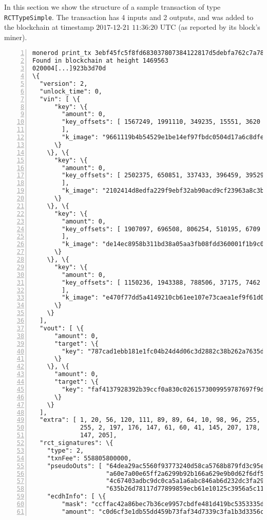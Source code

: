 \begin{appendices}
In this section we show the structure of a sample transaction of type {\tt RCTTypeSimple}. The transaction has 4 inputs and 2 outputs, and was added to the blockchain at timestamp \( \textrm{2017-12-21 11:36:20 UTC} \) (as reported by its block's miner).


\begin{Verbatim}[commandchars=\\\{\}, numbers=left]
monerod print_tx 3ebf45fc5f8fd683037807384122817d5debfa762c7a7845cb7ccfe9ee20940b 
Found in blockchain at height 1469563
020004[...]923b3d70d
\{
  "version": 2, 
  "unlock_time": 0, 
  "vin": [ \{
      "key": \{
        "amount": 0, 
        "key_offsets": [ 1567249, 1991110, 349235, 15551, 3620
        ], 
        "k_image": "9661119b4b54529e1be14ef97fbdc0504d17a6c8dfedd55d2455b93a6336bb41"
      \}
    \}, \{
      "key": \{
        "amount": 0, 
        "key_offsets": [ 2502375, 650851, 337433, 396459, 39529
        ], 
        "k_image": "2102414d8edfa229f9ebf32ab90acd9cf23963a8c3b6ba0e181fc1d5782c046c"
      \}
    \}, \{
      "key": \{
        "amount": 0, 
        "key_offsets": [ 1907097, 696508, 806254, 510195, 6709
        ], 
        "k_image": "de14ec8958b311bd38a05aa3fb08fdd360001f1b9c060264eecdd8c08c9e83c4"
      \}
    \}, \{
      "key": \{
        "amount": 0, 
        "key_offsets": [ 1150236, 1943388, 788506, 37175, 7462
        ], 
        "k_image": "e470f77dd5a4149210cb61ee107e73caea1ef9f61d05384e3bd4372fdc85bf17"
      \}
    \}
  ], 
  "vout": [ \{
      "amount": 0, 
      "target": \{
        "key": "787cad1ebb181e1fc04b24d4d06c3d2882c38b262a7635de8ad487c536e40a12"
      \}
    \}, \{
      "amount": 0, 
      "target": \{
        "key": "faf4137928392b39ccf0a830c0261573009959787697f9d4fb769c25781fb911"
      \}
    \}
  ], 
  "extra": [ 1, 20, 56, 120, 111, 89, 89, 64, 10, 98, 96, 255, 202, 235, 203, 
             255, 2, 197, 176, 147, 61, 60, 41, 145, 207, 178, 212, 71, 37, 69, 19, 
             147, 205], 
  "rct_signatures": \{
    "type": 2, 
    "txnFee": 558805800000, 
    "pseudoOuts": [ "64dea29ac5560f93773240d58ca5768b879fd3c95e0b3b50a80ec36a6ff3a6da",
                    "a60e7a00e65ff2a6299b92b166a629e9b0d62f6df50e40535140716757efe4c0", 
                    "4c67403adbc9dc0ca5a1a6abc846ab6d232dc3fa295099b3c7a9d005bac60eba", 
                    "635b26d78117d77899859ecb61e10125c3956a5c113b932f33c92c561acddaa3"], 
    "ecdhInfo": [ \{
        "mask": "ccffac42a86bec7b36ce9957cbdfe481d419bc5353335d0c236c347aea758d0c", 
        "amount": "c0d6cf3e1db55dd459b73faf34d7339c3fa1b3d3356cfb2adc3faf798264b00e"

\end{Verbatim}
\end{appendices}

